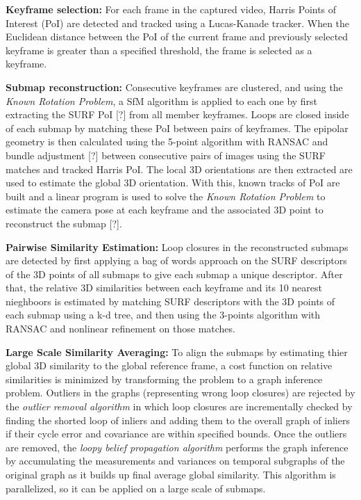 \documentclass[10pt,twocolumn,letterpaper]{article}
\begin{document}
\textbf{Keyframe selection:} For each frame in the captured video, Harris Points of Interest 
(PoI) are detected and tracked using a Lucas-Kanade tracker.  When the Euclidean distance between 
the PoI of the current frame and previously selected keyframe is greater than a specified threshold, the 
frame is selected as a keyframe.

\textbf{Submap reconstruction:} Consecutive keyframes are clustered, and using the 
\textit{Known Rotation Problem}, a SfM algorithm is applied to each one by first extracting the SURF 
PoI [?] from all member keyframes. Loops are closed inside of each submap by 
matching these PoI between pairs of keyframes. The epipolar geometry is then calculated 
using the 5-point algorithm with RANSAC and bundle adjustment [?] between consecutive pairs of images 
using the SURF matches and tracked Harris PoI. The local 3D orientations are then extracted are used to 
estimate the global 3D orientation. With this, known tracks of PoI are built and 
a linear program is used to solve the \textit{Known Rotation Problem} to estimate the camera pose at each 
keyframe and the associated 3D point to reconstruct the submap [?].

\textbf{Pairwise Similarity Estimation:} Loop closures in the reconstructed submaps are 
detected by first applying a bag of words approach on the SURF descriptors of the 3D 
points of all submaps to give each submap a unique descriptor.  After that, the relative 
3D similarities between each keyframe and its 10 nearest nieghboors is estimated by 
matching SURF descriptors with the 3D points of each submap using a k-d tree, 
and then using the 3-points algorithm with RANSAC and nonlinear refinement on 
those matches.

\textbf{Large Scale Similarity Averaging:} To align the submaps by 
estimating thier global 3D similarity to the global reference frame, a cost function on relative 
similarities is minimized by transforming the problem to a graph inference problem.  
Outliers in the graphs (representing wrong loop closures) are rejected by the 
\textit{outlier removal algorithm} in which loop closures are incrementally checked 
by finding the shorted loop of inliers and adding them to the overall graph of inliers 
if their cycle error and covariance are within specified bounds.  
Once the outliers are removed, the \textit{loopy belief propagation algorithm} performs the 
graph inference by accumulating the measurements and variances on temporal 
subgraphs of the original graph as it builds up final average global similarity. 
This algorithm is parallelized, so it can be applied on a large scale of submaps.
\end{document}
